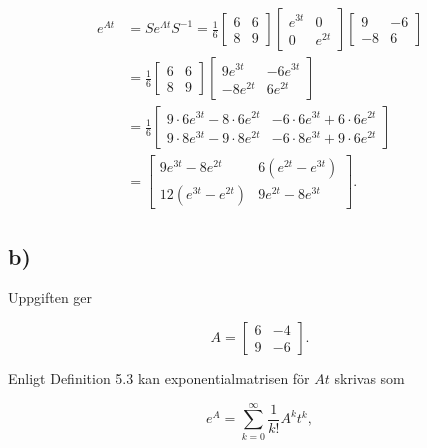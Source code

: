 \documentclass[a4paper]{article}
\newcommand{\mat}[1]{\bm{\mathit{#1}}}
\begin{document}
\begin{align*}
  e^{\mat{A}t} &= \mat{S}e^{\Lambda t}\mat{S}^{-1} = \frac 16 \begin{bmatrix}6 & 6\\8 & 9\end{bmatrix}\begin{bmatrix}e^{3t} & 0\\0 & e^{2t}\end{bmatrix}\begin{bmatrix}9 & -6\\-8 & 6\end{bmatrix}\\[2ex]
               &= \frac 16 \begin{bmatrix}6 & 6\\8 & 9\end{bmatrix}\begin{bmatrix}9e^{3t} & -6e^{3t}\\-8e^{2t} & 6e^{2t}\end{bmatrix}\\[2ex]
               &= \frac 16 \begin{bmatrix}9\cdot 6e^{3t} - 8\cdot 6e^{2t} & -6\cdot 6e^{3t} + 6\cdot 6e^{2t}\\9\cdot 8e^{3t} - 9\cdot 8e^{2t} & -6\cdot 8e^{3t} + 9\cdot 6e^{2t}\end{bmatrix}\\[2ex]
               &= \begin{bmatrix}9e^{3t} - 8e^{2t} & 6\left( e^{2t} - e^{3t} \right)\\12\left( e^{3t} - e^{2t} \right) & 9e^{2t} - 8e^{3t}\end{bmatrix}.
\end{align*}

\subsection*{b)}

Uppgiften ger

\begin{equation*}
\mat{A} = \begin{bmatrix} 6 & -4\\9 & -6\end{bmatrix}.
\end{equation*}

\noindent Enligt Definition 5.3 kan exponentialmatrisen för $\mat{A}t$ skrivas som 

\begin{equation*}
	e^{\mat{A}} = \sum_{k=0}^{\infty}\frac{1}{k!}\mat{A}^kt^k,
\end{equation*}
\end{document}

